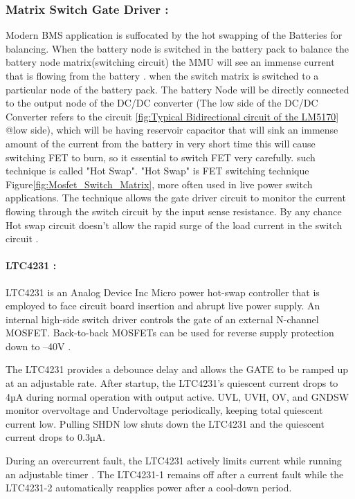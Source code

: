 \subsubsection{Matrix Switch Gate Driver :}
Modern BMS application is suffocated by the hot swapping of the Batteries for balancing. When the battery node is switched in the battery pack to balance the battery node matrix(switching circuit) the MMU will see an immense current that is flowing from the battery \cite{LTC4231_User_Datasheet}. when the switch matrix is switched to a particular node of the battery pack. The battery Node will be directly connected to the output node of the DC/DC converter (The low side of the DC/DC Converter refers to the circuit \ref{fig:Typical Bidirectional circuit of the LM5170} @low side), which will be having reservoir capacitor that will sink an immense amount of the current from the battery in very short time this will cause switching FET to burn, so it essential to switch FET very carefully. such technique is called "Hot Swap". "Hot Swap" is FET switching technique Figure\ref{fig:Mosfet_Switch_Matrix}, more often used in live power switch applications. The technique allows the gate driver circuit to monitor the current flowing through the switch circuit by the input sense resistance. By any chance Hot swap circuit doesn't allow the rapid surge of the load current in the switch circuit \cite{LTC4231_User_Datasheet}.
\paragraph{LTC4231 :}
LTC4231 is an Analog Device Inc Micro power hot-swap controller that is employed to face circuit board insertion and abrupt live power supply. An internal high-side switch driver controls the gate of an external N-channel MOSFET. Back-to-back MOSFETs can be used for reverse supply protection down to –40V \cite{LTC4231_User_Datasheet}.

The LTC4231 provides a debounce delay and allows the GATE to be ramped up at an adjustable rate. After startup, the LTC4231's quiescent current drops to 4µA during normal operation with output active. UVL, UVH, OV, and GNDSW monitor overvoltage and Undervoltage periodically, keeping total quiescent current low. Pulling SHDN low shuts down the LTC4231 and the quiescent current drops to 0.3µA.

During an overcurrent fault, the LTC4231 actively limits current while running an adjustable timer \cite{LTC4231_User_Datasheet}. The LTC4231-1 remains off after a current fault while the LTC4231-2 automatically reapplies power after a cool-down period\cite{LTC4231_User_Datasheet}.

